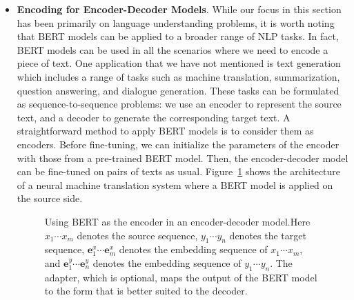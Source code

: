\begin{itemize}
    At test time, we search for the best span by
    \begin{eqnarray}
    (\hat{j}_1,\hat{j}_2) & = & \argmax_{1 \le j_1 \le j_2 \le n}\ \big( \log p_{j_1}^{\mathrm{beg}} + \log p_{j_2}^{\mathrm{end}} \big).
    \end{eqnarray}

\item \vspace{0.3em} \textbf{Encoding for Encoder-Decoder Models}. While our focus in this section has been primarily on language understanding problems, it is worth noting that BERT models can be applied to a broader range of NLP tasks. In fact, BERT models can be used in all the scenarios where we need to encode a piece of text. One application that we have not mentioned is text generation which includes a range of tasks such as machine translation, summarization, question answering, and dialogue generation. These tasks can be formulated as sequence-to-sequence problems: we use an encoder to represent the source text, and a decoder to generate the corresponding target text. A straightforward method to apply BERT models is to consider them as encoders. Before fine-tuning, we can initialize the parameters of the encoder with those from a pre-trained BERT model. Then, the encoder-decoder model can be fine-tuned on pairs of texts as usual. Figure~\ref{fig:bert-app-encoder-decoder} shows the architecture of a neural machine translation system where a BERT model is applied on the source side.

\begin{figure}[!ht]
\centering

\caption{Using BERT as the encoder in an encoder-decoder model.Here $x_1 \cdots x_m$ denotes the source sequence, $y_1 \cdots y_n$ denotes the target sequence, $\mathbf{e}_{1}^{x} \cdots \mathbf{e}_{m}^{x}$ denotes the embedding sequence of $x_1 \cdots x_m$, and $\mathbf{e}_{1}^{y} \cdots \mathbf{e}_{n}^{y}$ denotes the embedding sequence of $y_1 \cdots y_n$. The adapter, which is optional, maps the output of the BERT model to the form that is better suited to the decoder.}
\label{fig:bert-app-encoder-decoder}
\end{figure}

\end{itemize}
\vspace{0.5em}

